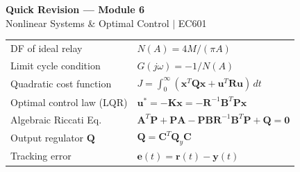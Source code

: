 \documentclass[12pt,a4paper]{article}
\begin{document}
\newpage
\begin{center}
  {\large\bfseries\color{myred} Quick Revision --- Module 6}\\[3pt]
  {\small\color{mydark} Nonlinear Systems \& Optimal Control $|$ EC601}
\end{center}
\noindent{\color{myred}\rule{\linewidth}{1.2pt}}\vspace{4pt}

\begin{tcolorbox}[formulabox, title={\textbf{Key Formulas at a Glance}}]
\begin{tabularx}{\linewidth}{B{5.0cm} X}
DF of ideal relay           & $N(A) = 4M/(\pi A)$ \\[2pt]
Limit cycle condition       & $G(j\omega) = -1/N(A)$ \\[2pt]
Quadratic cost function     & $J = \int_0^\infty (\mathbf{x}^T\mathbf{Q}\mathbf{x} + \mathbf{u}^T\mathbf{R}\mathbf{u})\,dt$ \\[2pt]
Optimal control law (LQR)   & $\mathbf{u}^* = -\mathbf{K}\mathbf{x} = -\mathbf{R}^{-1}\mathbf{B}^T\mathbf{P}\mathbf{x}$ \\[2pt]
Algebraic Riccati Eq.       & $\mathbf{A}^T\mathbf{P}+\mathbf{P}\mathbf{A}-\mathbf{P}\mathbf{B}\mathbf{R}^{-1}\mathbf{B}^T\mathbf{P}+\mathbf{Q}=\mathbf{0}$ \\[2pt]
Output regulator $\mathbf{Q}$ & $\mathbf{Q} = \mathbf{C}^T\mathbf{Q}_y\mathbf{C}$ \\[2pt]
Tracking error              & $\mathbf{e}(t) = \mathbf{r}(t) - \mathbf{y}(t)$
\end{tabularx}
\end{tcolorbox}

\vspace{5pt}
\end{document}
